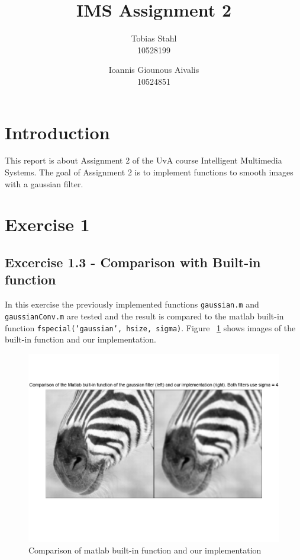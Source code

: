 \documentclass[11pt]{article}
\title{
	\textbf{IMS Assignment 2}
}
\author{Tobias Stahl \\ 10528199 \and Ioannis Giounous Aivalis \\ 10524851 }
\begin{document}
\maketitle


\section{Introduction}
This report is about Assignment 2 of the UvA course Intelligent Multimedia Systems. The goal of Assignment 2 is to implement functions to smooth images with a gaussian filter.\\

\section{Exercise 1}

\subsection{Excercise 1.3 - Comparison with Built-in function}
In this exercise the previously implemented functions \texttt{gaussian.m} and \texttt{gaussianConv.m} are tested and the result is compared to the matlab built-in function \texttt{fspecial('gaussian', hsize, sigma)}. Figure ~\ref{comp} shows images of the built-in function and our implementation.
\begin{figure}[h!]
\includegraphics[scale=0.6]{comparison.png}
\caption{Comparison of matlab built-in function and our implementation }
\label{comp}
\end{figure}
\end{document}
